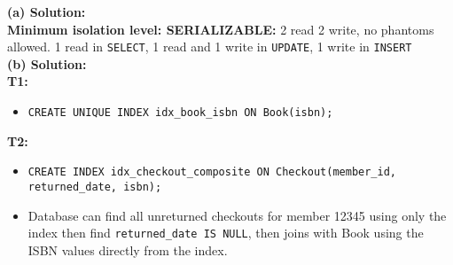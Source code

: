 \documentclass{article}
\begin{document}
\textbf{(a) Solution:}\\

\textbf{Minimum isolation level: SERIALIZABLE:} 2 read 2 write, no phantoms allowed. 1 read in 
\texttt{SELECT}, 1 read and 1 write in \texttt{UPDATE}, 1 write in \texttt{INSERT}\\
 
\textbf{(b) Solution:}\\

\textbf{T1:}
\begin{itemize}
    \item \texttt{CREATE UNIQUE INDEX idx\_book\_isbn ON Book(isbn);}
\end{itemize}

\textbf{T2:}

\begin{itemize}
    \item \texttt{CREATE INDEX idx\_checkout\_composite ON Checkout(member\_id, 
    returned\_date, isbn);}
    \item Database can find all unreturned checkouts for member 12345 using only the 
    index then find \texttt{returned\_date IS NULL}, then joins with Book using the ISBN values 
    directly from the index.
\end{itemize}
\end{document}
